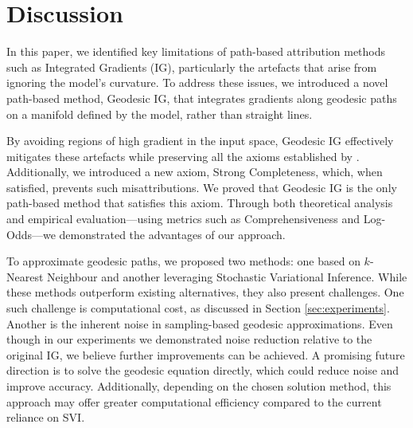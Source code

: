\section{Discussion} \label{sec:discussion}

In this paper, we identified key limitations of path-based attribution methods such as Integrated Gradients (IG), particularly the artefacts that arise from ignoring the model’s curvature. To address these issues, we introduced a novel path-based method, Geodesic IG, that integrates gradients along geodesic paths on a manifold defined by the model, rather than straight lines.

By avoiding regions of high gradient in the input space, Geodesic IG effectively mitigates these artefacts while preserving all the axioms established by \citet{sundararajan2017axiomatic}. Additionally, we introduced a new axiom, Strong Completeness, which, when satisfied, prevents such misattributions. We proved that Geodesic IG is the only path-based method that satisfies this axiom. Through both theoretical analysis and empirical evaluation—using metrics such as Comprehensiveness and Log-Odds—we demonstrated the advantages of our approach.

To approximate geodesic paths, we proposed two methods: one based on $k$-Nearest Neighbour and another leveraging Stochastic Variational Inference. While these methods outperform existing alternatives, they also present challenges. One such challenge is computational cost, as discussed in Section \ref{sec:experiments}. Another is the inherent noise in sampling-based geodesic approximations. Even though in our experiments we demonstrated noise reduction relative to the original IG, we believe further improvements can be achieved. A promising future direction is to solve the geodesic equation directly, which could reduce noise and improve accuracy. Additionally, depending on the chosen solution method, this approach may offer greater computational efficiency compared to the current reliance on SVI.